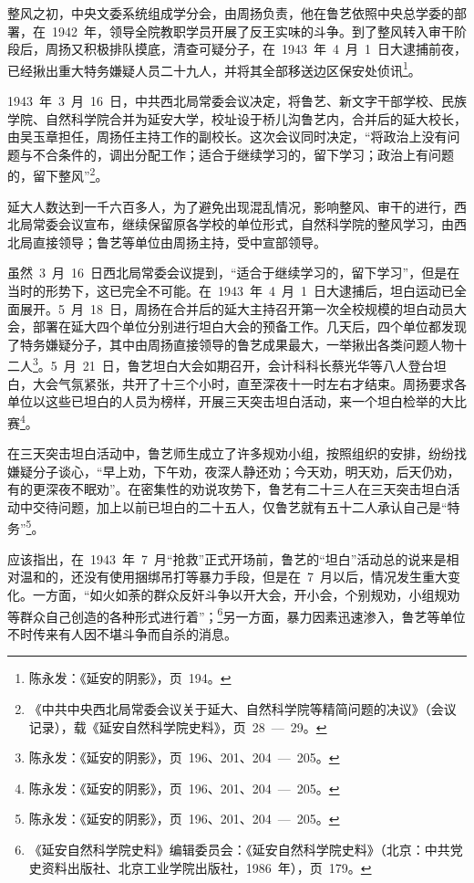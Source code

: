 整风之初，中央文委系统组成学分会，由周扬负责，他在鲁艺依照中央总学委的部署，在~1942~年，领导全院教职学员开展了反王实味的斗争。到了整风转入审干阶段后，周扬又积极排队摸底，清查可疑分子，在~1943~年~4~月~1~日大逮捕前夜，已经揪出重大特务嫌疑人员二十九人，并将其全部移送边区保安处侦讯\footnote{陈永发：《延安的阴影》，页~194。}。

1943~年~3~月~16~日，中共西北局常委会议决定，将鲁艺、新文字干部学校、民族学院、自然科学院合并为延安大学，校址设于桥儿沟鲁艺内，合并后的延大校长，由吴玉章担任，周扬任主持工作的副校长。这次会议同时决定，“将政治上没有问题与不合条件的，调出分配工作；适合于继续学习的，留下学习；政治上有问题的，留下整风”\footnote{《中共中央西北局常委会议关于延大、自然科学院等精简问题的决议》（会议记录），载《延安自然科学院史料》，页~28~—~29。}。

延大人数达到一千六百多人，为了避免出现混乱情况，影响整风、审干的进行，西北局常委会议宣布，继续保留原各学校的单位形式，自然科学院的整风学习，由西北局直接领导；鲁艺等单位由周扬主持，受中宣部领导。

虽然~3~月~16~日西北局常委会议提到，“适合于继续学习的，留下学习”，但是在当时的形势下，这已完全不可能。在~1943~年~4~月~1~日大逮捕后，坦白运动已全面展开。5~月~18~日，周扬在合并后的延大主持召开第一次全校规模的坦白动员大会，部署在延大四个单位分别进行坦白大会的预备工作。几天后，四个单位都发现了特务嫌疑分子，其中由周扬直接领导的鲁艺成果最大，一举揪出各类问题人物十二人\footnote{陈永发：《延安的阴影》，页~196、201、204~—~205。}。5~月~21~日，鲁艺坦白大会如期召开，会计科科长蔡光华等八人登台坦白，大会气氛紧张，共开了十三个小时，直至深夜十一时左右才结束。周扬要求各单位以这些已坦白的人员为榜样，开展三天突击坦白活动，来一个坦白检举的大比赛\footnote{陈永发：《延安的阴影》，页~196、201、204~—~205。}。

在三天突击坦白活动中，鲁艺师生成立了许多规劝小组，按照组织的安排，纷纷找嫌疑分子谈心，“早上劝，下午劝，夜深人静还劝；今天劝，明天劝，后天仍劝，有的更深夜不眠劝”。在密集性的劝说攻势下，鲁艺有二十三人在三天突击坦白活动中交待问题，加上以前已坦白的二十五人，仅鲁艺就有五十二人承认自己是“特务”\footnote{陈永发：《延安的阴影》，页~196、201、204~—~205。}。

应该指出，在~1943~年~7~月“抢救”正式开场前，鲁艺的“坦白”活动总的说来是相对温和的，还没有使用捆绑吊打等暴力手段，但是在~7~月以后，情况发生重大变化。一方面，“如火如荼的群众反奸斗争以开大会，开小会，个别规劝，小组规劝等群众自己创造的各种形式进行着”；\footnote{《延安自然科学院史料》编辑委员会：《延安自然科学院史料》（北京：中共党史资料出版社、北京工业学院出版社，1986~年），页~179。}另一方面，暴力因素迅速渗入，鲁艺等单位不时传来有人因不堪斗争而自杀的消息。


